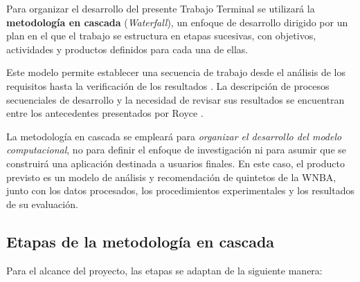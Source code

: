 Para organizar el desarrollo del presente Trabajo Terminal se utilizará la \textbf{metodología en cascada} (\textit{Waterfall}), un enfoque de desarrollo dirigido por un plan en el que el trabajo se estructura en etapas sucesivas, con objetivos, actividades y productos definidos para cada una de ellas. 

Este modelo permite establecer una secuencia de trabajo desde el análisis de los requisitos hasta la verificación de los resultados \cite{sommerville2016software,ibmWaterfallModel}. La descripción de procesos secuenciales de desarrollo y la necesidad de revisar sus resultados se encuentran entre los antecedentes presentados por Royce \cite{royce1970large}.

La metodología en cascada se empleará para \emph{organizar el desarrollo del modelo computacional}, no para definir el enfoque de investigación ni para asumir que se construirá una aplicación destinada a usuarios finales. En este caso, el producto previsto es un modelo de análisis y recomendación de quintetos de la WNBA, junto con los datos procesados, los procedimientos experimentales y los resultados de su evaluación.

\subsection{Etapas de la metodología en cascada}

Para el alcance del proyecto, las etapas se adaptan de la siguiente manera:

